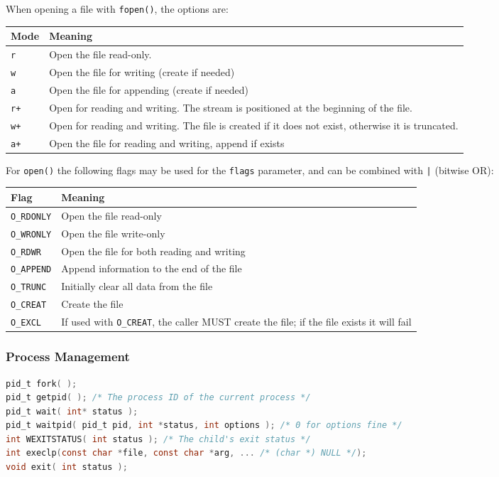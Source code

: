 \documentclass[legalpaper,10pt]{article}
\begin{document}
When opening a file with \texttt{fopen()}, the options are:\\
\begin{tabular}{l|l}
	\textbf{Mode} & \textbf{Meaning} \\ \hline
	\texttt{r} & Open the file read-only. \\ \hline
	\texttt{w} & Open the file for writing (create if needed) \\ \hline
	\texttt{a} & Open the file for appending (create if needed) \\ \hline
	\texttt{r+} & Open for reading and writing. The stream is positioned at the beginning of the file. \\ \hline
	\texttt{w+} & Open for reading and writing. The file is created if it does not exist, otherwise it is truncated. \\ \hline
	\texttt{a+} & Open the file for reading and writing, append if exists \\
\end{tabular}


For \texttt{open()} the following flags may be used for the \texttt{flags} parameter, and can be combined with \texttt{|} (bitwise OR):\\
\begin{tabular}{l|l}
	\textbf{Flag} & \textbf{Meaning} \\ \hline
	\texttt{O\_RDONLY} & Open the file read-only \\ \hline
	\texttt{O\_WRONLY} & Open the file write-only \\ \hline
	\texttt{O\_RDWR} & Open the file for both reading and writing \\ \hline
	\texttt{O\_APPEND} & Append information to the end of the file \\ \hline
	\texttt{O\_TRUNC} & Initially clear all data from the file \\ \hline
	\texttt{O\_CREAT} & Create the file \\ \hline	
	\texttt{O\_EXCL} & If used with \texttt{O\_CREAT}, the caller MUST create the file; if the file exists it will fail \\ 	
\end{tabular}


\subsubsection*{Process Management}

\begin{lstlisting}[language=C]
pid_t fork( );
pid_t getpid( ); /* The process ID of the current process */
pid_t wait( int* status );
pid_t waitpid( pid_t pid, int *status, int options ); /* 0 for options fine */
int WEXITSTATUS( int status ); /* The child's exit status */
int execlp(const char *file, const char *arg, ... /* (char *) NULL */);
void exit( int status );
\end{lstlisting}
\newpage
\end{document}
